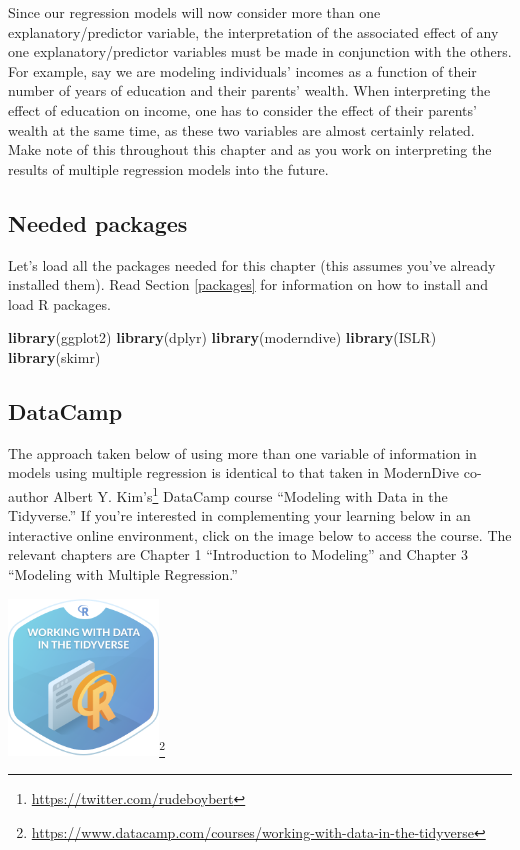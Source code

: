 \documentclass[12pt,]{krantz}
\makeatletter
\newenvironment{Shaded}{\begin{snugshade}}{\end{snugshade}}
\newcommand{\KeywordTok}[1]{\textcolor[rgb]{0.27,0.27,0.27}{\textbf{#1}}}
\newcommand{\NormalTok}[1]{#1}
\renewcommand{\href}[2]{#2\footnote{\url{#1}}}
\newenvironment{kframe}{%
\medskip{}
\setlength{\fboxsep}{.8em}
 \def\at@end@of@kframe{}%
 \ifinner\ifhmode%
  \def\at@end@of@kframe{\end{minipage}}%
  \begin{minipage}{\columnwidth}%
 \fi\fi%
 \def\FrameCommand##1{\hskip\@totalleftmargin \hskip-\fboxsep
 \colorbox{shadecolor}{##1}\hskip-\fboxsep
     \hskip-\linewidth \hskip-\@totalleftmargin \hskip\columnwidth}%
 \MakeFramed {\advance\hsize-\width
   \@totalleftmargin\z@ \linewidth\hsize
   \@setminipage}}%
 {\par\unskip\endMakeFramed%
 \at@end@of@kframe}
\renewenvironment{Shaded}{\begin{kframe}}{\end{kframe}}
\theoremstyle{definition}
\theoremstyle{definition}
\theoremstyle{definition}
\theoremstyle{remark}
\makeatother
\begin{document}
Since our regression models will now consider more than one
explanatory/predictor variable, the interpretation of the associated
effect of any one explanatory/predictor variables must be made in
conjunction with the others. For example, say we are modeling
individuals' incomes as a function of their number of years of education
and their parents' wealth. When interpreting the effect of education on
income, one has to consider the effect of their parents' wealth at the
same time, as these two variables are almost certainly related. Make
note of this throughout this chapter and as you work on interpreting the
results of multiple regression models into the future.

\subsection*{Needed packages}\label{needed-packages-4}


Let's load all the packages needed for this chapter (this assumes you've
already installed them). Read Section \ref{packages} for information on
how to install and load R packages.

\begin{Shaded}
\begin{Highlighting}[]
\KeywordTok{library}\NormalTok{(ggplot2)}
\KeywordTok{library}\NormalTok{(dplyr)}
\KeywordTok{library}\NormalTok{(moderndive)}
\KeywordTok{library}\NormalTok{(ISLR)}
\KeywordTok{library}\NormalTok{(skimr)}
\end{Highlighting}
\end{Shaded}

\subsection*{DataCamp}\label{datacamp-4}


The approach taken below of using more than one variable of information
in models using multiple regression is identical to that taken in
ModernDive co-author \href{https://twitter.com/rudeboybert}{Albert Y.
Kim's} DataCamp course ``Modeling with Data in the Tidyverse.'' If
you're interested in complementing your learning below in an interactive
online environment, click on the image below to access the course. The
relevant chapters are Chapter 1 ``Introduction to Modeling'' and Chapter
3 ``Modeling with Multiple Regression.''

\begin{center}
\href{https://www.datacamp.com/courses/working-with-data-in-the-tidyverse}{\includegraphics[width=0.3\textwidth]{images/datacamp_working_with_data.png}}
\end{center}
\end{document}
